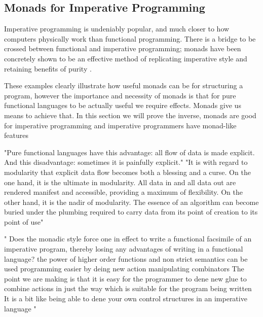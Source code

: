 \subsection{Monads for Imperative Programming}
Imperative programming is undeniably popular,
and much closer to how computers physically work than functional programming.
There is a bridge to be crossed between functional and imperative programming;
monads have been concretely shown to be an effective method of replicating
imperative style and retaining benefits of purity \cite{PeytonJones:1993}.

These examples clearly illustrate how useful monads can be for structuring a program,
however the importance and necessity of monads is that for pure functional languages
to be actually useful we require effects. Monads give us means to achieve that.
In this section we will prove the inverse,
monads are good for imperative programming
and imperative programmers have monad-like features

"Pure functional languages have this advantage:
all flow of data is made explicit. And this disadvantage: sometimes it is painfully explicit."
"It is with regard to modularity that explicit data flow becomes both a blessing and a curse.
On the one hand, it is the ultimate in modularity.
All data in and all data out are rendered manifest and accessible, providing a maximum of flexibility. On the other hand, it is the nadir of modularity. The essence of an algorithm can become buried under the plumbing required to carry data from its point of creation to its point of use"
\cite{wadler1995monads}

"
Does the monadic style force one in effect to write a functional facsimile of an
imperative program, thereby losing any advantages of writing in a functional language?
the power of higher order functions and non strict semantics can be used
programming easier by deing new action manipulating combinators
The point we are making is that it is easy for the programmer to dene new glue to
combine actions in just the way which is suitable for the program being written
It is a bit like being able to dene your own control structures in an imperative language
"\cite{PeytonJones:1993}

